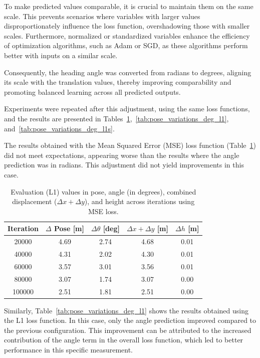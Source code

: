 To make predicted values comparable, it is crucial to maintain them on the same scale. This prevents scenarios where variables with larger values disproportionately influence the loss function, overshadowing those with smaller scales. Furthermore, normalized or standardized variables enhance the efficiency of optimization algorithms, such as Adam or SGD, as these algorithms perform better with inputs on a similar scale.

Consequently, the heading angle was converted from radians to degrees, aligning its scale with the translation values, thereby improving comparability and promoting balanced learning across all predicted outputs.

Experiments were repeated after this adjustment, using the same loss functions, and the results are presented in Tables~\ref{tab:pose_variations_deg_mse},~\ref{tab:pose_variations_deg_l1}, and~\ref{tab:pose_variations_deg_l1s}.

The results obtained with the Mean Squared Error (MSE) loss function (Table~\ref{tab:pose_variations_deg_mse}) did not meet expectations, appearing worse than the results where the angle prediction was in radians. This adjustment did not yield improvements in this case.

\begin{table}[H]
    \centering
    \scriptsize
    \renewcommand{\arraystretch}{1.2} 
    \setlength{\tabcolsep}{10pt} 
    \begin{tabular}{c c c c c}
        \toprule
        \textbf{Iteration} & \textbf{$\Delta$ Pose [m]} & \textbf{$\Delta \theta$ [deg]} & \textbf{$\Delta x + \Delta y$ [m]} & \textbf{$\Delta h$ [m]} \\
        \midrule
        \num{20000}  & 4.69 & 2.74  & 4.68 & 0.01 \\
        \num{40000}  & 4.31 & 2.02  & 4.30 & 0.01 \\
        \num{60000}  & 3.57 & 3.01  & 3.56 & 0.01 \\
        \num{80000}  & 3.07 & 1.74  & 3.07 & 0.00 \\
        \num{100000} & 2.51 & 1.81  & 2.51 & 0.00 \\
        \bottomrule
    \end{tabular}
    \caption{Evaluation (L1) values in pose, angle (in degrees), combined displacement ($\Delta x + \Delta y$), and height across iterations using MSE loss.}
    \label{tab:pose_variations_deg_mse}
\end{table}

Similarly, Table~\ref{tab:pose_variations_deg_l1} shows the results obtained using the L1 loss function. In this case, only the angle prediction improved compared to the previous configuration. This improvement can be attributed to the increased contribution of the angle term in the overall loss function, which led to better performance in this specific measurement.

